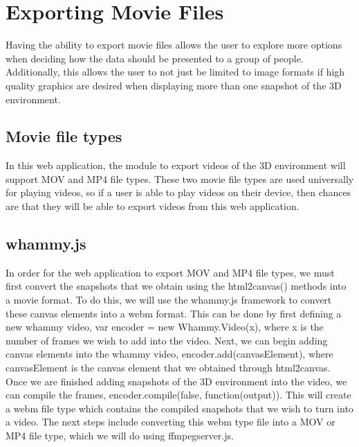 \documentclass[letterpaper,10pt,titlepage, onecolumn, draftclsnofoot]{IEEEtran}
\begin{document}
\section{Exporting Movie Files}
Having the ability to export movie files allows the user to explore more options when deciding how the data should be presented to a group of people. Additionally, this allows the user to not just be limited to image formats if high quality graphics are desired when displaying more than one snapshot of the 3D environment. 

\subsection{Movie file types}
In this web application, the module to export videos of the 3D environment will support MOV and MP4 file types. These two movie file types are used universally for playing videos, so if a user is able to play videos on their device, then chances are that they will be able to export videos from this web application.

\subsection{whammy.js}
In order for the web application to export MOV and MP4 file types, we must first convert the snapshots that we obtain using the html2canvas() methods into a movie format. To do this, we will use the whammy.js\cite{whammy.js} framework to convert these canvas elements into a webm format. \newline
\indent This can be done by first defining a new whammy video, var encoder = new Whammy.Video(x), where x is the number of frames we wish to add into the video. Next, we can begin adding canvas elements into the whammy video, encoder.add(canvasElement), where canvasElement is the canvas element that we obtained through html2canvas. Once we are finished adding snapshots of the 3D environment into the video, we can compile the frames, encoder.compile(false, function(output){}). This will create a webm file type which contains the compiled snapshots that we wish to turn into a video. The next steps include converting this webm type file into a MOV or MP4 file type, which we will do using ffmpegserver.js. 
\end{document}
